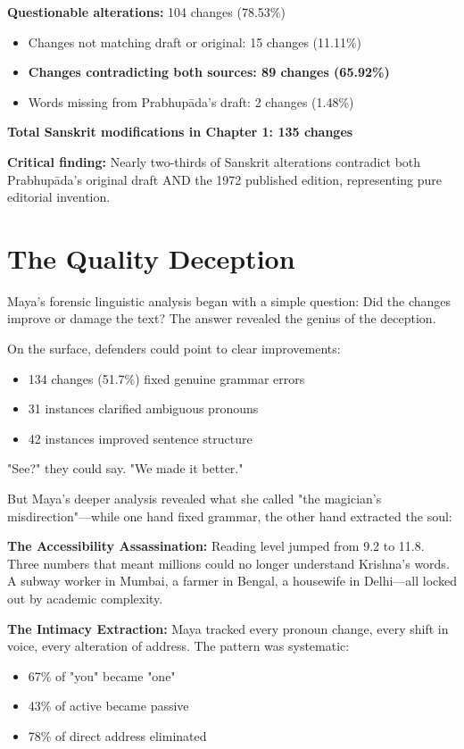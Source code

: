 \documentclass[11pt,twoside]{book}
\begin{document}
\textbf{\textbf{Questionable alterations:}} 104 changes (78.53\%)  
\begin{itemize}
\item Changes not matching draft or original: 15 changes (11.11\%)
\item \textbf{\textbf{Changes contradicting both sources: 89 changes (65.92\%)}}
\item Words missing from Prabhupāda's draft: 2 changes (1.48\%)
\end{itemize}

\textbf{\textbf{Total Sanskrit modifications in Chapter 1: 135 changes}}

\textbf{\textbf{Critical finding:}} Nearly two-thirds of Sanskrit alterations contradict both Prabhupāda's original draft AND the 1972 published edition, representing pure editorial invention.
\section*{The Quality Deception}
\label{sec:org7fccd64}

Maya's forensic linguistic analysis began with a simple question: Did the changes improve or damage the text? The answer revealed the genius of the deception.

On the surface, defenders could point to clear improvements:
\begin{itemize}
\item 134 changes (51.7\%) fixed genuine grammar errors
\item 31 instances clarified ambiguous pronouns
\item 42 instances improved sentence structure
\end{itemize}

"See?" they could say. "We made it better."

But Maya's deeper analysis revealed what she called "the magician's misdirection"—while one hand fixed grammar, the other hand extracted the soul:

\textbf{\textbf{The Accessibility Assassination:}}
Reading level jumped from 9.2 to 11.8. Three numbers that meant millions could no longer understand Krishna's words. A subway worker in Mumbai, a farmer in Bengal, a housewife in Delhi—all locked out by academic complexity.

\textbf{\textbf{The Intimacy Extraction:}}
Maya tracked every pronoun change, every shift in voice, every alteration of address. The pattern was systematic:
\begin{itemize}
\item 67\% of "you" became "one"
\item 43\% of active became passive
\item 78\% of direct address eliminated
\end{itemize}
\end{document}
